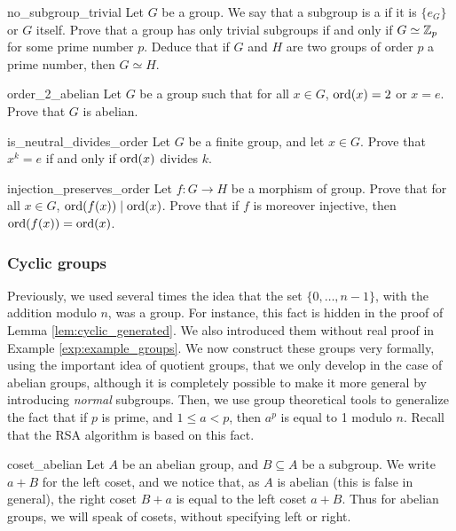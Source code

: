\begin{cex}{}{no_subgroup_trivial}
    Let \( G \) be a group. We say that a subgroup is a  if it is \( \{ e_G \} \) or \( G \) itself. Prove that a group has only trivial subgroups if and only if \( G \simeq \mathbb{Z}_p \) for some prime number \( p \). Deduce that if \( G \) and \( H \) are two groups of order \( p \) a prime number, then \( G \simeq H \). 
\end{cex}

\begin{cex}{}{order_2_abelian}
    Let \( G \) be a group such that for all \( x \in G \), \( \operatorname{ord}(x) = 2 \) or \( x = e \). Prove that \( G \) is abelian.    
\end{cex}

\begin{cex}{}{is_neutral_divides_order}
    Let \( G \) be a finite group, and let \( x \in G \). Prove that \( x^k = e \) if and only if \( \operatorname{ord}(x) \) divides \( k \).
\end{cex}

\begin{cex}{}{injection_preserves_order}
    Let \( f : G \to H \) be a morphism of group. Prove that for all \( x \in G \), \( \operatorname{ord}(f(x)) \mid \operatorname{ord}(x) \). Prove that if \( f \) is moreover injective, then \(  \operatorname{ord}(f(x)) = \operatorname{ord}(x) \).
\end{cex}

\subsubsection{Cyclic groups}

Previously, we used several times the idea that the set \( \{ 0, \dots, n - 1 \} \), with the addition modulo \( n \), was a group. For instance, this fact is hidden in the proof of Lemma \ref{lem:cyclic_generated}. We also introduced them without real proof in Example \ref{exp:example_groups}. We now construct these groups very formally, using the important idea of quotient groups, that we only develop in the case of abelian groups, although it is completely possible to make it more general by introducing \textit{normal} subgroups. Then, we use group theoretical tools to generalize the fact that if \( p \) is prime, and \( 1 \le a < p \), then \( a^p \) is equal to 1 modulo \( n \). Recall that the RSA algorithm is based on this fact.

\begin{crem}{}{coset_abelian}
    Let \( A \) be an abelian group, and \( B \subseteq A \) be a subgroup. We write \( a + B \) for the left coset, and we notice that, as \( A \) is abelian (this is false in general), the right coset \( B + a \) is equal to the left coset \( a + B \). Thus for abelian groups, we will speak of cosets, without specifying left or right.     
\end{crem}

